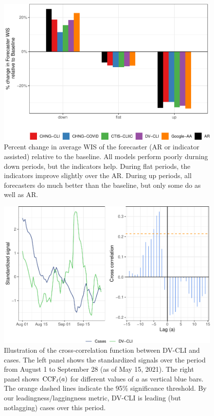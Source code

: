 \documentclass[9pt,twoside,lineno]{pnas-new}
\begin{document}
\begin{figure}

{\centering \includegraphics[width=\textwidth]{fig/upswing-summary-remake-1} 

}

\caption{Percent change in average WIS of the forecaster (AR or indicator assisted) relative to the baseline. All models perform poorly durning down periods, but the indicators help. During flat periods, the indicators improve slightly over the AR. During up periods, all forecasters do much better than the baseline, but only some do as well as AR.}\label{fig:upswing-summary-remake}
\end{figure}

\clearpage

\begin{figure}

{\centering \includegraphics[width=\textwidth]{fig/ccf-dv-finalized-1} 

}

\caption{Illustration of the cross-correlation function between DV-CLI and cases. The left panel shows the standardized signals over the period from August 1 to September 28 (as of May 15, 2021). The right panel shows $\mathrm{CCF}_{\ell}(a)$ for different values of $a$ as vertical blue bars. The orange dashed lines indicate the 95\% significance threshold. By our leadingness/laggingness metric, DV-CLI is leading (but notlagging) cases over this period.}\label{fig:ccf-dv-finalized}
\end{figure}
\end{document}
